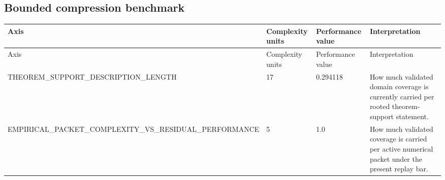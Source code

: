 \subsection{Bounded compression benchmark}
\begin{longtable}{p{}p{}p{}p{}}
\toprule
Axis & Complexity units & Performance value & Interpretation \\
\midrule
\endfirsthead
\toprule
Axis & Complexity units & Performance value & Interpretation \\
\midrule
\endhead
THEOREM\_SUPPORT\_DESCRIPTION\_LENGTH & 17 & 0.294118 & How much validated domain coverage is currently carried per rooted theorem-support statement. \\
EMPIRICAL\_PACKET\_COMPLEXITY\_VS\_RESIDUAL\_PERFORMANCE & 5 & 1.0 & How much validated coverage is carried per active numerical packet under the present replay bar. \\
\bottomrule
\end{longtable}
